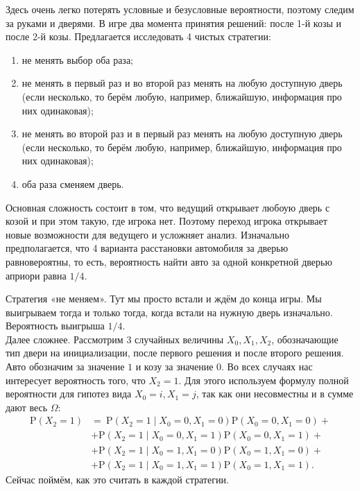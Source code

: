 \documentclass[12pt]{article}
\newcommand{\Proba}[1]{\mathrm{P}\left( #1 \right)}
\newcommand{\Probc}[2]{\mathrm{P}\left( #1 \mid #2\right)}
\begin{document}
\begin{enumerate}
    
    Здесь очень легко потерять условные и безусловные вероятности, поэтому следим за руками и дверями. 
    В игре два момента принятия решений: после 1-й козы и после 2-й козы. 
    Предлагается исследовать 4 чистых стратегии:
    
    \begin{enumerate}
    \item не менять выбор оба раза;
    \item не менять в первый раз и во второй раз менять на любую доступную дверь (если несколько, то берём любую, например, ближайшую, информация про них одинаковая);
    \item не менять во второй раз и в первый раз менять на любую доступную дверь (если несколько, то берём любую, например, ближайшую, информация про них одинаковая);
    \item оба раза сменяем дверь.
    \end{enumerate}
    
    Основная сложность состоит в том, что ведущий открывает любоую дверь с козой и при этом такую, где игрока нет. 
    Поэтому переход игрока открывает новые возможности для ведущего и усложняет анализ. 
    Изначально предполагается, что 4 варианта расстановки автомобиля за дверью равновероятны, то есть, вероятность найти авто за одной конкретной дверью априори равна $1/4$.
    
    Стратегия «не меняем». Тут мы просто встали и ждём до конца игры. Мы выигрываем тогда и только тогда, когда встали на нужную дверь изначально. Вероятность выигрыша $1/4$.\\
    
    Далее сложнее. Рассмотрим $3$ случайных величины $X_0,X_1,X_2$, обозначающие тип двери на инициализации, после первого решения и после второго решения. Авто обозначим за значение $1$ и козу за значение $0$. Во всех случаях нас интересует вероятность того, что $X_2=1$. Для этого используем формулу полной вероятности для гипотез вида $X_0=i,X_1=j$, так как они несовместны и в сумме дают весь $\Omega$:
    \begin{align*}
    \Proba{X_2=1} &= ~ \Probc{X_2=1}{X_0=0,X_1=0} \Proba{X_0=0,X_1=0} +\\
    &+ \Probc{X_2=1}{X_0=0,X_1=1} \Proba{X_0=0,X_1=1} +\\
    &+ \Probc{X_2=1}{X_0=1,X_1=0} \Proba{X_0=1,X_1=0} +\\
    &+ \Probc{X_2=1}{X_0=1,X_1=1} \Proba{X_0=1,X_1=1}.
    \end{align*}
    Сейчас поймём, как это считать в каждой стратегии.
    

\end{enumerate}
\end{document}
